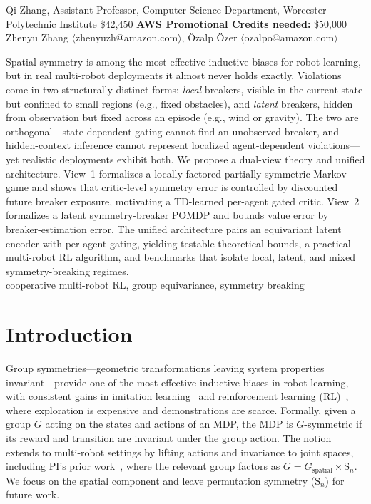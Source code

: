 \documentclass[11pt]{article}
\begin{document}

 Qi Zhang, Assistant Professor, Computer Science Department, Worcester Polytechnic Institute
 \$42,450 \qquad
{\bf AWS Promotional Credits needed:} \$50,000\\
Zhenyu Zhang $\langle$zhenyuzh@amazon.com$\rangle$,
Özalp Özer $\langle$ozalpo@amazon.com$\rangle$

Spatial symmetry is among the most effective inductive biases for robot learning, but in real multi-robot deployments it almost never holds exactly. Violations come in two structurally distinct forms: \emph{local} breakers, visible in the current state but confined to small regions (e.g., fixed obstacles), and \emph{latent} breakers, hidden from observation but fixed across an episode (e.g., wind or gravity). The two are orthogonal—state-dependent gating cannot find an unobserved breaker, and hidden-context inference cannot represent localized agent-dependent violations—yet realistic deployments exhibit both. We propose a dual-view theory and unified architecture. View~1 formalizes a locally factored partially symmetric Markov game and shows that critic-level symmetry error is controlled by discounted future breaker exposure, motivating a TD-learned per-agent gated critic. View~2 formalizes a latent symmetry-breaker POMDP and bounds value error by breaker-estimation error. The unified architecture pairs an equivariant latent encoder with per-agent gating, yielding testable theoretical bounds, a practical multi-robot RL algorithm, and benchmarks that isolate local, latent, and mixed symmetry-breaking regimes.\\
cooperative multi-robot RL, group equivariance, symmetry breaking


\section{Introduction}
Group symmetries—geometric transformations leaving system properties invariant—provide one of the most effective inductive biases in robot learning, with consistent gains in imitation learning~\citep{zeng2021transporter,wang2024equivariantdiffusion,seo2025survey} and reinforcement learning (RL)~\citep{vanderpol2020mdp,wang2022so2,luo2024reinforcement}, where exploration is expensive and demonstrations are scarce.
Formally, given a group $G$ acting on the states and actions of an MDP, the MDP is $G$-symmetric if its reward and transition are invariant under the group action.
The notion extends to multi-robot settings by lifting actions and invariance to joint spaces, including PI's prior work~\citep{chen2022communicationefficient,chen20243}, where the relevant group factors as $G = G_{\text{spatial}} \times \mathrm{S}_n$. We focus on the spatial component and leave permutation symmetry ($\mathrm{S}_n$) for future work.
\end{document}
